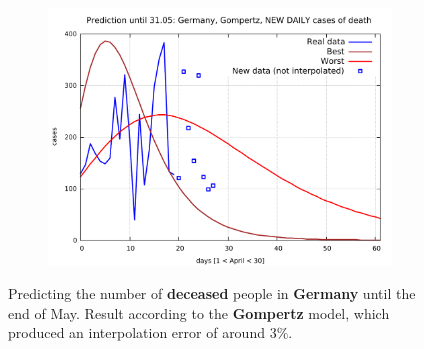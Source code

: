 \documentclass[8pt]{article}
\begin{document}
\begin{figure}[h!]
\begin{subfigure}[b]{0.48\linewidth}
  \includegraphics[width=\linewidth]{../de_g_d/peak/peak_prediction.pdf}
  \end{subfigure}
	\caption{Predicting the number of \textbf{deceased}
	people in \textbf{Germany} until the
	end of May. Result according to the 
	\textbf{Gompertz} model, which produced
	an interpolation error of around $3\%$.}
\end{figure}
\end{document}
